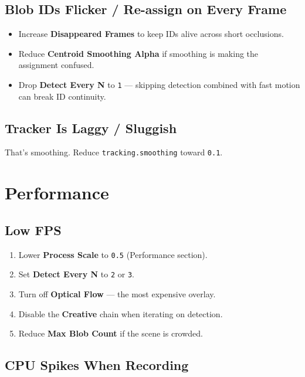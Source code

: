 \documentclass[11pt,a4paper,openany]{report}
\begin{document}
\subsection{Blob IDs Flicker / Re-assign on Every Frame}

\begin{itemize}
    \item Increase \textbf{Disappeared Frames} to keep IDs alive across
        short occlusions.
    \item Reduce \textbf{Centroid Smoothing Alpha} if smoothing is making
        the assignment confused.
    \item Drop \textbf{Detect Every N} to \texttt{1} --- skipping detection
        combined with fast motion can break ID continuity.
\end{itemize}

\subsection{Tracker Is Laggy / Sluggish}

That's smoothing. Reduce \texttt{tracking.smoothing} toward \texttt{0.1}.

\section{Performance}

\subsection{Low FPS}

\begin{enumerate}
    \item Lower \textbf{Process Scale} to \texttt{0.5} (Performance section).
    \item Set \textbf{Detect Every N} to \texttt{2} or \texttt{3}.
    \item Turn off \textbf{Optical Flow} --- the most expensive overlay.
    \item Disable the \textbf{Creative} chain when iterating on detection.
    \item Reduce \textbf{Max Blob Count} if the scene is crowded.
\end{enumerate}

\subsection{CPU Spikes When Recording}
\end{document}
